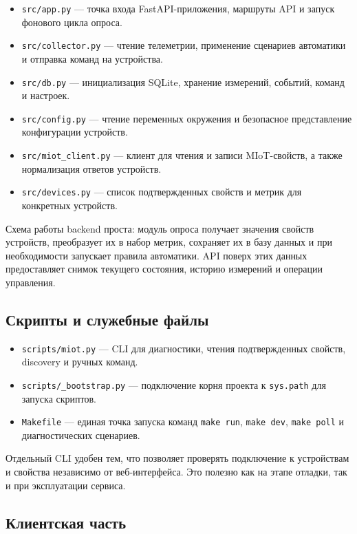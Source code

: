 \documentclass[a4paper,article,14pt]{extarticle}
\begin{document}
\begin{itemize}
    \item \texttt{src/app.py} --- точка входа FastAPI-приложения, маршруты API и запуск фонового цикла опроса.
    \item \texttt{src/collector.py} --- чтение телеметрии, применение сценариев автоматики и отправка команд на устройства.
    \item \texttt{src/db.py} --- инициализация SQLite, хранение измерений, событий, команд и настроек.
    \item \texttt{src/config.py} --- чтение переменных окружения и безопасное представление конфигурации устройств.
    \item \texttt{src/miot\_client.py} --- клиент для чтения и записи MIoT-свойств, а также нормализация ответов устройств.
    \item \texttt{src/devices.py} --- список подтвержденных свойств и метрик для конкретных устройств.
\end{itemize}

Схема работы backend проста: модуль опроса получает значения свойств устройств, преобразует их в набор метрик, сохраняет их в базу данных и при необходимости запускает правила автоматики. API поверх этих данных предоставляет снимок текущего состояния, историю измерений и операции управления.

\subsection{Скрипты и служебные файлы}

\begin{itemize}
    \item \texttt{scripts/miot.py} --- CLI для диагностики, чтения подтвержденных свойств, discovery и ручных команд.
    \item \texttt{scripts/\_bootstrap.py} --- подключение корня проекта к \texttt{sys.path} для запуска скриптов.
    \item \texttt{Makefile} --- единая точка запуска команд \texttt{make run}, \texttt{make dev}, \texttt{make poll} и диагностических сценариев.
\end{itemize}

Отдельный CLI удобен тем, что позволяет проверять подключение к устройствам и свойства независимо от веб-интерфейса. Это полезно как на этапе отладки, так и при эксплуатации сервиса.

\subsection{Клиентская часть}
\end{document}
